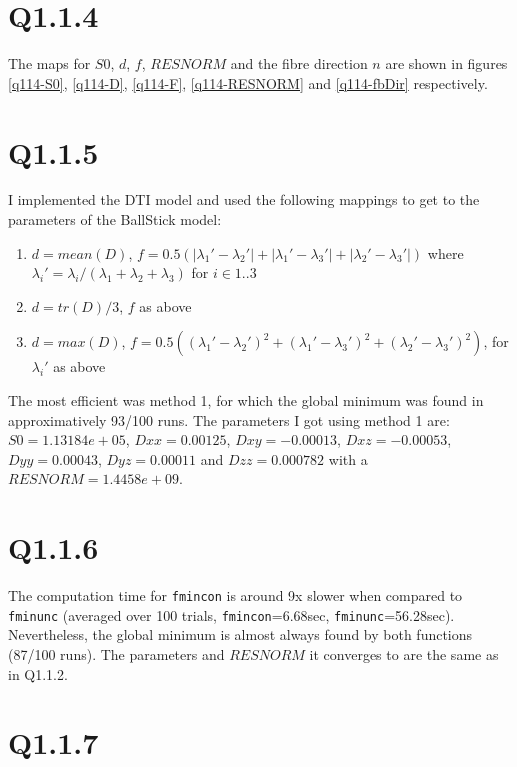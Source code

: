 \documentclass[11pt,a4paper,oneside]{report}
\begin{document}
\section*{Q1.1.4}

The maps for $S0$, $d$, $f$, $RESNORM$ and the fibre direction $n$ are shown in figures \ref{q114-S0}, \ref{q114-D}, \ref{q114-F}, \ref{q114-RESNORM} and \ref{q114-fbDir} respectively. 

\section*{Q1.1.5}

I implemented the DTI model and used the following mappings to get to the parameters of the BallStick model:
\begin{enumerate}
 \item $d = mean(D)$, $f = 0.5 ( |\lambda_1'- \lambda_2'| + |\lambda_1'- \lambda_3'| + |\lambda_2'- \lambda_3'|) $ where $\lambda_i' = \lambda_i/(\lambda_1 + \lambda_2 + \lambda_3)$ for $i \in 1..3$
 \item $d = tr(D)/3$, $f$ as above
 \item $d = max(D)$,  $f = 0.5 ( (\lambda_1'- \lambda_2')^2 + (\lambda_1'- \lambda_3')^2 + (\lambda_2'- \lambda_3')^2) $, for $\lambda_i'$ as above
\end{enumerate}

The most efficient was method 1, for which the global minimum was found in approximatively 93/100 runs. The parameters I got using method 1 are:$S0=1.13184e+05$, $Dxx=0.00125$, $Dxy=-0.00013$, $Dxz=-0.00053$, $Dyy=0.00043$, $Dyz=0.00011$ and $Dzz=0.000782$ with a $RESNORM=1.4458e+09$.



\section*{Q1.1.6}

The computation time for \texttt{fmincon} is around 9x slower when compared to \texttt{fminunc} (averaged over 100 trials, \texttt{fmincon}=6.68sec, \texttt{fminunc}=56.28sec). Nevertheless, the global minimum is almost always found by both functions (87/100 runs). The parameters and $RESNORM$ it converges to are the same as in Q1.1.2.

\section*{Q1.1.7}
\end{document}

